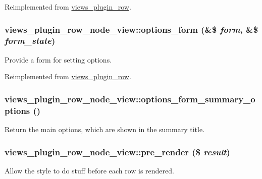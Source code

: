 Reimplemented from \hyperlink{classviews__plugin__row_abf02e5f51e907c5009edda15d997c161}{views\_\-plugin\_\-row}.\hypertarget{classviews__plugin__row__node__view_a7bc31b38a1cc4474695af3a564fde775}{
\subsubsection[{options\_\-form}]{\setlength{\rightskip}{0pt plus 5cm}views\_\-plugin\_\-row\_\-node\_\-view::options\_\-form (\&\$ {\em form}, \/  \&\$ {\em form\_\-state})}}
\label{classviews__plugin__row__node__view_a7bc31b38a1cc4474695af3a564fde775}
Provide a form for setting options. 

Reimplemented from \hyperlink{classviews__plugin__row_a6914c39d64977a0aa71da39cc1af004e}{views\_\-plugin\_\-row}.\hypertarget{classviews__plugin__row__node__view_a36ec9ec1547dae456e8669de4b5625ce}{
\subsubsection[{options\_\-form\_\-summary\_\-options}]{\setlength{\rightskip}{0pt plus 5cm}views\_\-plugin\_\-row\_\-node\_\-view::options\_\-form\_\-summary\_\-options ()}}
\label{classviews__plugin__row__node__view_a36ec9ec1547dae456e8669de4b5625ce}
Return the main options, which are shown in the summary title. \hypertarget{classviews__plugin__row__node__view_a5a6428b6994ff8c0ff52e1e9022fc8eb}{
\subsubsection[{pre\_\-render}]{\setlength{\rightskip}{0pt plus 5cm}views\_\-plugin\_\-row\_\-node\_\-view::pre\_\-render (\$ {\em result})}}
\label{classviews__plugin__row__node__view_a5a6428b6994ff8c0ff52e1e9022fc8eb}
Allow the style to do stuff before each row is rendered.


